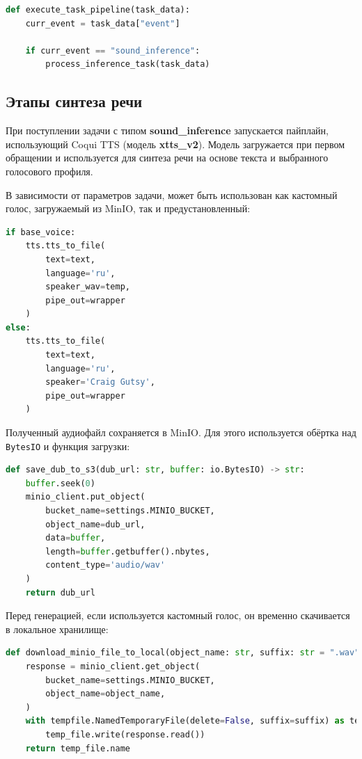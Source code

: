 \begin{lstlisting}[language=Python, numbers=none, frame=none]
def execute_task_pipeline(task_data):
    curr_event = task_data["event"]

    if curr_event == "sound_inference":
        process_inference_task(task_data)
\end{lstlisting}

\subsection{Этапы синтеза речи}
При поступлении задачи с типом \textbf{sound\_inference} запускается пайплайн,
использующий Coqui TTS (модель \textbf{xtts\_v2}). Модель загружается при первом
обращении и используется для синтеза речи на основе текста и выбранного голосового профиля.

В зависимости от параметров задачи, может быть использован как кастомный голос,
загружаемый из MinIO, так и предустановленный:

\begin{lstlisting}[language=Python, numbers=none, frame=none]
if base_voice:
    tts.tts_to_file(
        text=text,
        language='ru',
        speaker_wav=temp,
        pipe_out=wrapper
    )
else:
    tts.tts_to_file(
        text=text,
        language='ru',
        speaker='Craig Gutsy',
        pipe_out=wrapper
    )
\end{lstlisting}

Полученный аудиофайл сохраняется в MinIO. Для этого используется обёртка
над \texttt{BytesIO} и функция загрузки:

\begin{lstlisting}[language=Python, numbers=none, frame=none]
def save_dub_to_s3(dub_url: str, buffer: io.BytesIO) -> str:
    buffer.seek(0)
    minio_client.put_object(
        bucket_name=settings.MINIO_BUCKET,
        object_name=dub_url,
        data=buffer,
        length=buffer.getbuffer().nbytes,
        content_type='audio/wav'
    )
    return dub_url
\end{lstlisting}

Перед генерацией, если используется кастомный голос, он временно скачивается
в локальное хранилище:

\begin{lstlisting}[language=Python, numbers=none, frame=none]
def download_minio_file_to_local(object_name: str, suffix: str = ".wav") -> str:
    response = minio_client.get_object(
        bucket_name=settings.MINIO_BUCKET,
        object_name=object_name,
    )
    with tempfile.NamedTemporaryFile(delete=False, suffix=suffix) as temp_file:
        temp_file.write(response.read())
    return temp_file.name
\end{lstlisting}

